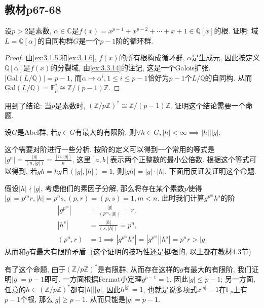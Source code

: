 \subsection{教材p67-68}

\begin{problem}\label{ex:3.4.1}
    设$p > 2$是素数, $\alpha \in \mathbb{C}$是$f(x) = x^{p - 1} + x^{p - 2} + \cdots + x + 1 \in \mathbb{Q}[x]$的根. 证明: 域$L = \mathbb{Q}[\alpha]$的自同构群$G$是一个$p - 1$阶的循环群.
\end{problem}

\begin{proof}
    由\ref{ex:3.1.5}和\ref{ex:3.1.6}, $f(x)$的所有根构成循环群, $\alpha$是生成元, 因此按定义$\mathbb{Q}[\alpha]$是$f(x)$的分裂域, 由\ref{ex:3.3.14}的注记, 这是一个Galois扩张. $|\mathrm{Gal}(L/\mathbb{Q})| = p - 1$, 而$\alpha \mapsto \alpha^i, 1 \leqslant i \leqslant p - 1$恰好为$p - 1$个$L/\mathbb{Q}$的自同构. 从而$\mathrm{Gal}(L/\mathbb{Q}) = \mathbb{F}_p^* \cong \mathbb{Z}/(p - 1)\mathbb{Z}$.
\end{proof}

\begin{remark}
    用到了结论: 当$p$是素数时, $(\mathbb{Z}/p\mathbb{Z})^* \cong \mathbb{Z}/(p - 1)\mathbb{Z}$. 证明这个结论需要一个命题.
    \begin{propstar}
        设$G$是Abel群, 若$g \in G$有最大的有限阶, 则$\forall h \in G, |h| < \infty \implies |h| \Big| |g|$.
    \end{propstar}
    这个需要对阶进行一些分析. 按阶的定义可以得到一个常用的等式是$|g^n| = \frac{|g|}{(n, |g|)} = \frac{[n, |g|]}{n}$, 这里$[a, b]$表示两个正整数的最小公倍数. 根据这个等式可以得到, 若$gh = hg$且$(|g|, |h|) = 1$, 则$|gh| = |g| \cdot |h|$. 下面用反证发证明这个命题.
    
    假设$|h| \nmid |g|$, 考虑他们的素因子分解, 那么将存在某个素数$p$使得$|g| = p^mr, |h| = p^ns, (p, r) = (p, s) = 1, m < n$. 此时我们计算$g^{p^m}h^s$的阶
    \[
    \begin{aligned}
        |g^{p^m}| &= \frac{|g|}{(p^m, |g|)} = r,\\
        |h^s| &= \frac{|h|}{(s, |h|)} = p^n,\\
        (p^n, r) &= 1 \implies |g^{p^m}h^s| = |g^{p^m}||h^s| = p^nr > |g|
    \end{aligned}
    \]
    从而和$g$有最大有限阶矛盾. (这个证明的技巧性还是挺强的, 以上都在教材4.3节)

    有了这个命题, 由于$(\mathbb{Z}/p\mathbb{Z})^*$是有限群, 从而存在这样的$g$有最大的有限阶, 我们证明$|g| = p - 1$即可. 一方面根据Fermat小定理$g^{p - 1} = 1$, 因此$|g| \leqslant p - 1$; 另一方面, 任意的$h \in (\mathbb{Z}/p\mathbb{Z})^*$都有$|h| \Big| |g|$, 因此$h^{|g|} = 1$, 也就是说多项式$x^|g| - 1$在$\mathbb{F}_p$上有$p - 1$个根, 那么$|g| \geqslant p - 1$. 从而只能是$|g| = p - 1$.
\end{remark}

